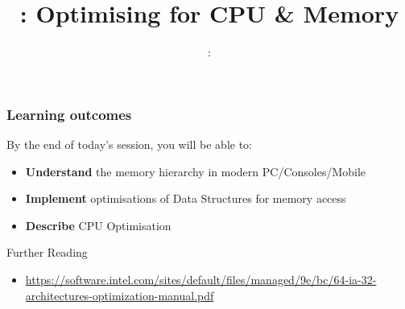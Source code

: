 \usepackage{../../beamerthemeFalmouthGamesAcademy}
\usepackage{multimedia}
\graphicspath{ {../../} }


\usepackage[normalem]{ulem}
\usepackage{wasysym}

\usepackage{pdfpages}

\usetikzlibrary{arrows,automata}




\title{\sessionnumber: Optimising for CPU \& Memory}
\subtitle{\modulecode: \moduletitle}

\frame{\titlepage} 

\begin{frame}
	\frametitle{Learning outcomes}
	By the end of today's session, you will be able to:
	\begin{itemize}
		\item \textbf{Understand} the memory hierarchy in modern PC/Consoles/Mobile
		\item \textbf{Implement} optimisations of Data Structures for memory access
		\item \textbf{Describe} CPU Optimisation
	\end{itemize}
\end{frame}





\begin{frame}{Further Reading}
	\begin{itemize}
		\item \url{https://software.intel.com/sites/default/files/managed/9e/bc/64-ia-32-architectures-optimization-manual.pdf}
	\end{itemize}
\end{frame}


